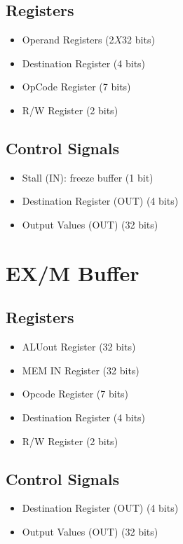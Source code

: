 \documentclass[12pt]{report}
\begin{document}
\subsection{Registers}
\begin{itemize}
    \item Operand Registers (2$X$32 bits)
    \item Destination Register (4 bits)
    \item OpCode Register (7 bits)
    \item R/W Register (2 bits)
\end{itemize}

\subsection{Control Signals}
\begin{itemize}
    \item Stall (IN): freeze buffer (1 bit)
    \item Destination Register (OUT) (4 bits)
    \item Output Values (OUT) (32 bits)
\end{itemize}

\section{EX/M Buffer}

\subsection{Registers}
\begin{itemize}
    \item ALUout Register (32 bits)
    \item MEM IN Register (32 bits)
    \item Opcode Register (7 bits)
    \item Destination Register (4 bits)
    \item R/W Register (2 bits)
\end{itemize}

\subsection{Control Signals}
\begin{itemize}
    \item Destination Register (OUT) (4 bits)
    \item Output Values (OUT) (32 bits)
\end{itemize}
\end{document}
